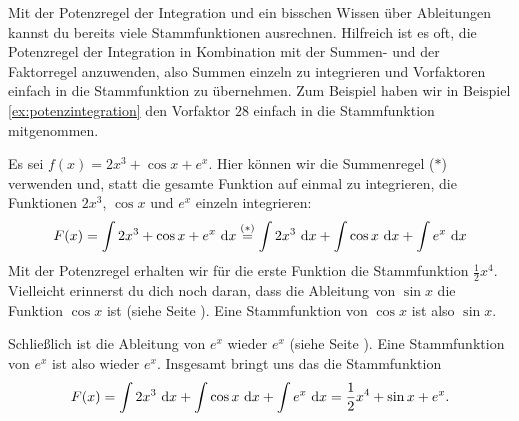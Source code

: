 \documentclass[../../main.tex]{subfiles}
\begin{document}
Mit der Potenzregel der Integration und ein bisschen Wissen über Ableitungen kannst du bereits viele Stammfunktionen
ausrechnen. Hilfreich ist es oft, die Potenzregel der Integration in Kombination mit der Summen- und der Faktorregel
anzuwenden, also Summen einzeln zu integrieren und Vorfaktoren einfach in die Stammfunktion zu übernehmen. Zum Beispiel haben wir 
in Beispiel \ref{ex:potenzintegration} den Vorfaktor $28$ einfach in die Stammfunktion mitgenommen.
\begin{example}{}
    Es sei $f(x)=2x^3+\cos x+e^x$. Hier können wir die Summenregel ($*$) verwenden und, statt die gesamte Funktion auf einmal
    zu integrieren, die Funktionen $2x^3$, $\cos x$ und $e^x$ einzeln integrieren:
    \[F(x)=\int2x^3+\cos x+e^x\mathop{}\mathrm{d} x\stackrel{(*)}{=}\int 2x^3\mathop{}\mathrm{d} x+\int\cos x\mathop{}\mathrm{d} x+\int e^x\mathop{}\mathrm{d} x\]
    Mit der Potenzregel erhalten wir für die erste Funktion die Stammfunktion $\frac{1}{2}x^4$. Vielleicht erinnerst du 
    dich noch daran, dass die Ableitung von $\sin x$ die Funktion $\cos x$ ist (siehe Seite \pageref{ableitung-trigonometrie}).
    Eine Stammfunktion von $\cos x$ ist also $\sin x$.

    Schließlich ist die Ableitung von $e^x$ wieder $e^x$ (siehe Seite \pageref{ableitung-exponentialfunktion}). Eine
    Stammfunktion von $e^x$ ist also wieder $e^x$. Insgesamt bringt uns das die Stammfunktion
    \[F(x)=\int 2x^3\mathop{}\mathrm{d} x+\int\cos x\mathop{}\mathrm{d} x+\int e^x\mathop{}\mathrm{d} x=\frac{1}{2}x^4+\sin x+e^x.\]
\end{example}
\end{document}
